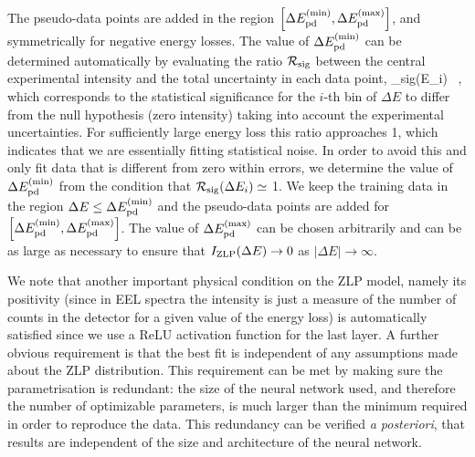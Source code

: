   The pseudo-data points are added in the region $\left[ \Delta E_{\rm pd}^{\rm (min)},
  \Delta E_{\rm pd}^{\rm (max)}\right]$, and symmetrically for negative energy losses.
The value of $\Delta E_{\rm pd}^{\rm (min)}$
can be determined automatically by evaluating the ratio $\mathcal{R}_{\rm sig}$ between the central
experimental intensity and the total uncertainty in each data point,
\be
\label{eq:pdlocation}
_{\rm sig}(\Delta E_i)\equiv {} \, ,
\ee
which corresponds to the statistical significance for the $i$-th bin of $\Delta E$ to differ from the null hypothesis
(zero intensity) taking into account the experimental uncertainties.
%
For sufficiently large energy loss this ratio approaches 1, which indicates that we are essentially
fitting statistical noise. 
%
In order to avoid this and only fit data that is different from zero within errors, we determine the value
of $\Delta E_{\rm pd}^{\rm (min)}$ from the condition that $ \mathcal{R}_{\rm sig}(\Delta E_i) \simeq$ 1. 
%
We keep the training data in the region $\Delta E \le \Delta E_{\rm pd}^{\rm (min)}$ and the pseudo-data
points are added for $\left[ \Delta E_{\rm pd}^{\rm (min)}, \Delta E_{\rm pd}^{\rm (max)}\right]$. 
%
The value of $\Delta E_{\rm pd}^{\rm (max)}$ can be chosen arbitrarily and can be as large as necessary
to ensure that $I_{\rm ZLP}(\Delta E)\to 0$ as $|\Delta E| \to \infty$.

We note that another important physical condition on the ZLP model, namely its positivity
(since in EEL spectra the intensity is just a measure of the number of counts in the
detector for a given value of the energy loss) is automatically satisfied since
we use a ReLU activation function for the last layer.
%
A further obvious requirement is that the best fit is independent of any assumptions 
made about the ZLP distribution. 
%
This requirement can be met by making sure the parametrisation is redundant: 
the size of the neural network used, and therefore the number of optimizable parameters, 
is much larger than the minimum required in order to reproduce the data. 
%
This redundancy can be verified {\it a posteriori}, that results are independent of 
the size and architecture of the neural network.\\

